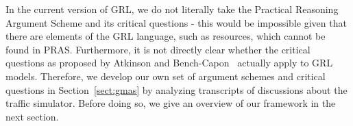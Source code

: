 In the current version of GRL, we do not literally take the Practical Reasoning Argument Scheme and its critical questions - this would be impossible given that there are elements of the GRL language, such as resources, which cannot be found in PRAS. Furthermore, it is not directly clear whether the critical questions as proposed by Atkinson and Bench-Capon~\cite{atkinson2007} actually apply to GRL models. Therefore, we develop our own set of argument schemes and critical questions in Section~\ref{sect:gmas} by analyzing transcripts of discussions about the traffic simulator. Before doing so, we give an overview of our framework in the next section.
